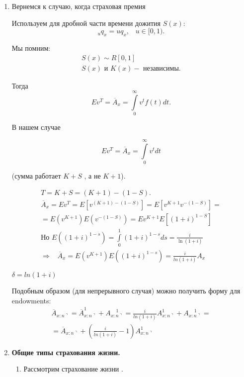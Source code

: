 \begin{enumerate}
	\item Вернемся к случаю, когда страховая премия 

	Используем  для дробной части времени дожития $ S(x)$:
	\[ {}_uq_x = uq_x, \;\;\; u \in [0,1). \]

	Мы помним: 
	\begin{gather*}
		S(x) \sim R[0,1] \\
		S(x) \text{ и } K(x) - \text{ независимы}.
	\end{gather*}

	Тогда
	\[ Ev^T = \overline{A}_x = \int\limits^{\infty}_{0}v^tf(t)dt.\]

	В нашем случае

	\[ Ev^T = \overline{A}_x = \int\limits^{\infty}_{0}v^tdt \]

	(сумма работает $ K+S $ , а не $ K+1$).

	\begin{gather*}
		T = K + S = (K + 1) - (1 - S).\\
		\overline{A}_x = Ev^T = E[v^{(K+1) - (1-S)}] = E[v^{K+1}v^{-(1-S)}]=\\
		=E(v^{K+1})E(v^{-(1-S)}) = Ev^{K+1}E[(1+i)^{1-S}]\\
		\text{Но } E((1+i)^{1-s}) = \int\limits^{1}_{0}(1+i)^{1-s}ds = \frac{i}{\ln(1+i)}\\
		\Rightarrow\;\;\;\overline{A}_x = E(v^{K+1})E((1+i)^{1-s}) = \frac{i}{ln(1+i)}A_x
 	\end{gather*}
	\begin{notation}
		$\delta = ln(1+i)$
	\end{notation}

	Подобным образом (для непрерывного случая) можно получить форму для endowments:
	\begin{gather*}
		\overline{A}_{x:n\urcorner} = \overline{A}_{x:n\urcorner}^{1} + A_{x:n\urcorner}^{\;\;\;\;1} = \frac{i}{ln(1+i)}A_{x:n\urcorner}^{1}+ A_{x:n\urcorner}^{\;\;\;\;1} = \\
		= \overline{A}_{x:n\urcorner} + (\frac{i}{ln(1+i)} - 1)A_{x:n\urcorner}^{1}
	\end{gather*}

	\item \textbf{Общие типы страхования жизни.}
		\begin{enumerate}
			\item Рассмотрим страхование жизни .


\end{enumerate}
\end{enumerate}

